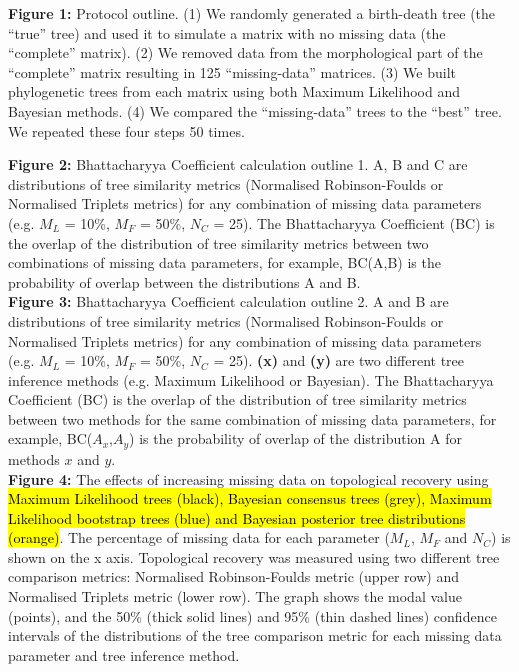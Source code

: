\documentclass[12pt,letterpaper]{article}
\begin{document}
\noindent
\textbf{Figure 1:} Protocol outline.
(1) We randomly generated a birth-death tree (the ``true'' tree) and used it to simulate a matrix with no missing data (the ``complete'' matrix).
(2) We removed data from the morphological part of the ``complete'' matrix resulting in 125 ``missing-data'' matrices.
(3) We built phylogenetic trees from each matrix using both Maximum Likelihood and Bayesian methods.
(4) We compared the ``missing-data'' trees to the ``best'' tree.
We repeated these four steps 50 times.\\
\bigskip

\noindent
\textbf{Figure 2:} Bhattacharyya Coefficient calculation outline 1. A, B and C are distributions of tree similarity metrics (Normalised Robinson-Foulds or Normalised Triplets metrics) for any combination of missing data parameters (e.g. $M_{L}$ = 10\%, $M_{F}$ = 50\%, $N_{C}$ = 25). The Bhattacharyya Coefficient (BC) is the overlap of the distribution of tree similarity metrics between two combinations of missing data parameters, for example, BC(A,B) is the probability of overlap between the distributions A and B.\\

\noindent
\textbf{Figure 3:} Bhattacharyya Coefficient calculation outline 2. A and B are distributions of tree similarity metrics (Normalised Robinson-Foulds or Normalised Triplets metrics) for any combination of missing data parameters (e.g. $M_{L}$ = 10\%, $M_{F}$ = 50\%, $N_{C}$ = 25). \textbf{(x)} and \textbf{(y)} are two different tree inference methods (e.g. Maximum Likelihood or Bayesian). The Bhattacharyya Coefficient (BC) is the overlap of the distribution of tree similarity metrics between two methods for the same combination of missing data parameters, for example, BC($A_{x}$,$A_{y}$) is the probability of overlap of the distribution A for methods $x$ and $y$.\\

\bigskip
\noindent
\textbf{Figure 4:} The effects of increasing missing data on topological recovery using \hl{Maximum Likelihood trees (black), Bayesian consensus trees (grey), Maximum Likelihood bootstrap trees (blue) and Bayesian posterior tree distributions (orange)}. The percentage of missing data for each parameter ($M_{L}$, $M_{F}$ and $N_{C}$) is shown on the x axis. Topological recovery was measured using two different tree comparison metrics: Normalised Robinson-Foulds metric (upper row) and Normalised Triplets metric (lower row). The graph shows the modal value (points), and the 50\% (thick solid lines) and 95\% (thin dashed lines) confidence intervals of the distributions of the tree comparison metric for each missing data parameter and tree inference method.
\end{document}
